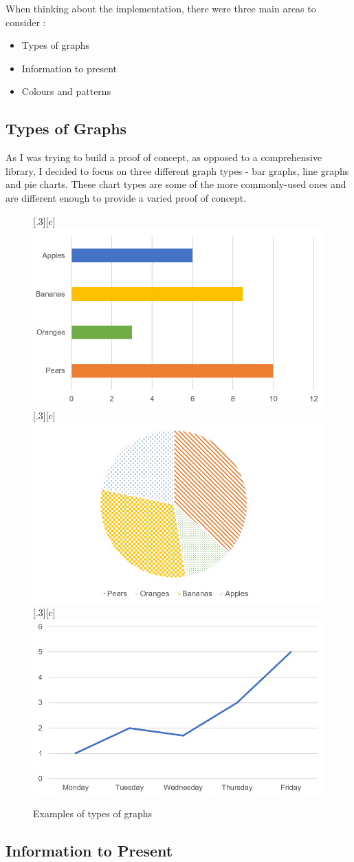 \documentclass[ %
                    author={Aleena Baig},
                supervisor={Dr Simon Lock},
                    degree={BSc},
                     title={On Making Web Accessible Graphs},
                  subtitle={},
                      year={2019} ]{dissertation}
\begin{document}
When thinking about the implementation, there were three main areas to consider :

\begin{itemize}
    \item Types of graphs
    \item Information to present
    \item Colours and patterns
\end{itemize}

\subsection{Types of Graphs}

As I was trying to build a proof of concept, as opposed to a comprehensive library, I decided to focus on three different graph types - bar graphs, line graphs and pie charts. These chart types are some of the more commonly-used ones and are different enough to provide a varied proof of concept.

\newline
\begin{figure}[H]
  \centering
  [.3\linewidth][c]{%
    \includegraphics[width=.3\linewidth]{images/BarGraph.PNG}}\quad
  [.3\linewidth][c]{%
    \includegraphics[width=.3\linewidth]{images/PieGraph.PNG}}\quad
  [.3\linewidth][c]{%
    \includegraphics[width=.3\linewidth]{images/LineGraph.PNG}}
  \caption{Examples of types of graphs}    
\end{figure}

\subsection{Information to Present}
\end{document}

